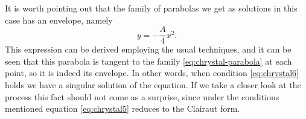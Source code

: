 It is worth pointing out that the family of parabolas we get as solutions in this case has an envelope, namely
\[
y= -\frac{A}{4}x^2.
\]
This expression can be derived employing the usual techniques, and it can be seen that this parabola is tangent to the family \eqref{eq:chrystal-parabola} at each point, so it is indeed its envelope. In other words, when condition \eqref{eq:chrystal6} holds we have a singular solution of the equation. If we take a closer look at the process this fact should not come as a surprise, since under the conditions mentioned equation \eqref{eq:chrystal5} reduces to the Clairaut form.
